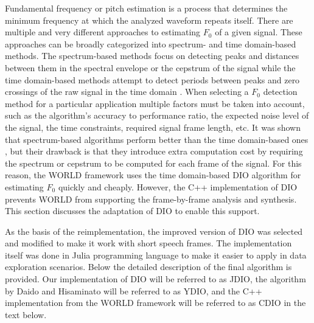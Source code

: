 \documentclass[a4paper]{article}
\begin{document}
Fundamental frequency or pitch estimation is a process that determines the minimum frequency at which the analyzed waveform repeats itself. There are multiple and very different approaches to estimating $F_0$ of a given signal. These approaches can be broadly categorized into spectrum- and time domain-based methods. The spectrum-based methods focus on detecting peaks and distances between them in the spectral envelope or the cepstrum of the signal while the time domain-based methods attempt to detect periods between peaks and zero crossings of the raw signal in the time domain \cite{PitchDetection}. When selecting a $F_0$ detection method for a particular application multiple factors must be taken into account, such as the algorithm's accuracy to performance ratio, the expected noise level of the signal, the time constraints, required signal frame length, etc. It was shown that spectrum-based algorithms perform better than the time domain-based ones \cite{PitchDetectionPerformance}, but their drawback is that they introduce extra computation cost by requiring the spectrum or cepstrum to be computed for each frame of the signal. For this reason, the WORLD framework uses the time domain-based DIO algorithm for estimating $F_0$ quickly and cheaply. However, the C++ implementation of DIO prevents WORLD from supporting the frame-by-frame analysis and synthesis. This section discusses the adaptation of DIO to enable this support.

As the basis of the reimplementation, the improved version of DIO was selected \cite{YamahaDIO} and modified to make it work with short speech frames. The implementation itself was done in Julia programming language to make it easier to apply in data exploration scenarios. Below the detailed description of the final algorithm is provided. Our implementation of DIO will be referred to as JDIO, the algorithm by Daido and Hisaminato will be referred to as YDIO, and the C++ implementation from the WORLD framework will be referred to as CDIO in the text below.
\end{document}
